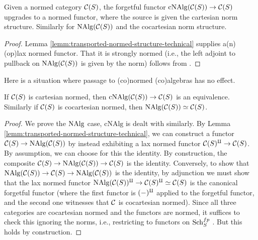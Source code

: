\documentclass{amsart}
\numberwithin{proposition}{section}
\numberwithin{equation}{section}
\def\cNAlg{\mathrm{cNAlg}}
\begin{document}
\begin{corollary} \label{cor:forgetful-normed}
Given a normed category $\mathcal C(S)$, the forgetful functor $\cNAlg(\scr C(S)) \to \scr C(S)$ upgrades to a normed functor, where the source is given the cartesian norm structure.
Similarly for $\mathrm{NAlg}(\mathcal C(S))$ and the cocartesian norm structure.
\end{corollary}
\begin{proof}
Lemma \ref{lemm:transported-normed-structure-technical} supplies a(n) (op)lax normed functor.
That it is strongly normed (i.e., the left adjoint to pullback on $\mathrm{NAlg}(\mathcal C(S))$ is given by the norm) follows from \cite[Theorem 8.5]{bachmann-norms}.
\end{proof}

Here is a situation where passage to (co)normed (co)algebras has no effect.
\begin{lemma} \label{lemm:cNAlg-cartesian-normed}
If $\mathcal C(S)$ is cartesian normed, then $\cNAlg(\scr C(S)) \to \scr C(S)$ is an equivalence.
Similarly if $\mathcal C(S)$ is cocartesian normed, then $\mathrm{NAlg}(\mathcal C(S)) \simeq \mathcal C(S)$.
\end{lemma}
\begin{proof}
We prove the $\mathrm{NAlg}$ case, $\cNAlg$ is dealt with similarly.
By Lemma \ref{lemm:transported-normed-structure-technical}, we can construct a functor $\mathcal C(S) \to \mathrm{NAlg}(\mathcal C(S))$ by instead exhibiting a lax normed functor $\mathcal C(S)^\amalg \to \mathcal C(S)$.
By assumption, we can choose for this the identity.
By construction, the composite $\mathcal C(S) \to \mathrm{NAlg}(\mathcal C(S)) \to \mathcal C(S)$ is the identity.
Conversely, to show that $\mathrm{NAlg}(\mathcal C(S)) \to \mathcal C(S) \to \mathrm{NAlg}(\mathcal C(S))$ is the identity, by adjunction we must show that the lax normed functor $\mathrm{NAlg}(\mathcal C(S))^\amalg \to \mathcal C(S)^\amalg \simeq \mathcal C(S)$ is the canonical forgetful functor (where the first functor is $(\mathord-)^\amalg$ applied to the forgetful functor, and the second one witnesses that $\mathcal C$ is cocartesian normed).
Since all three categories are cocartesian normed and the functors are normed, it suffices to check this ignoring the norms, i.e., restricting to functors on $\mathrm{S}\mathrm{ch}{}_S^{fp}$ \cite[Theorem 3.3]{dauser2024uniqueness}.
But this holds by construction.
\end{proof}
\end{document}
